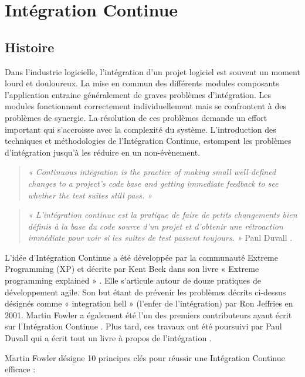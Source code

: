 \chapter{Intégration Continue}

  \section{Histoire}
  Dans l’industrie logicielle, l’intégration d’un projet logiciel est souvent un moment lourd et douloureux. La mise en commun des différents modules composants l’application entraine généralement de graves problèmes d’intégration. Les modules fonctionnent correctement individuellement mais se confrontent à des problèmes de synergie. La résolution de ces problèmes demande un effort important qui s’accroisse avec la complexité du système. L’introduction des techniques et méthodologies de l’Intégration Continue, estompent les problèmes d’intégration jusqu’à les réduire en un non-évènement.\\

  \begin{quotation}
    \emph{« Continuous integration is the practice of making small well-defined changes to a project’s code base and getting immediate feedback to see whether the test suites still pass. »}
  \end{quotation}

  \begin{quotation}
    \emph{« L'intégration continue est la pratique de faire de petits changements bien définis à la base du code source d'un projet et d'obtenir une rétroaction immédiate pour voir si les suites de test passent toujours. »} Paul Duvall \cite{Duv07}.\\
  \end{quotation}

  L’idée d'Intégration Continue a été développée par la communauté Extreme Programming (XP) et décrite par Kent Beck dans son livre « Extreme programming explained » \cite{Bec99}. Elle s'articule autour de douze pratiques de développement agile. Son but étant de prévenir les problèmes décrits ci-dessus désignés comme « integration hell » (l’enfer de l’intégration) par Ron Jeffries en 2001. Martin Fowler a également été l'un des premiers contributeurs ayant écrit sur l’Intégration Continue \cite{Fow00}. Plus tard, ces travaux ont été poursuivi par Paul Duvall qui a écrit tout un livre à propos de l’intégration \cite{Duv07}.

  Martin Fowler \cite{Fow00} désigne 10 principes clés pour réussir une Intégration Continue efficace :\\

